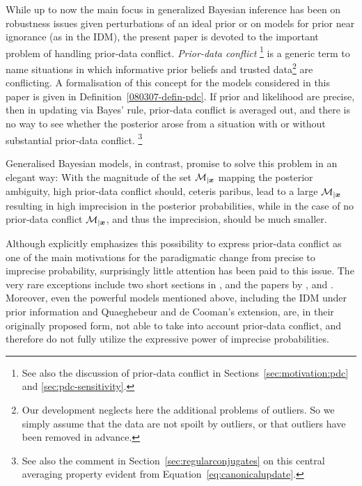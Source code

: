 While up to now the main focus in generalized Bayesian inference
has been on robustness issues given perturbations of an ideal
prior \parencite[e.g.,][]{2000:rios} or
on models for prior near ignorance (as in the IDM), the present
paper is devoted to the important problem of handling
prior-data conflict. \emph{Prior-data conflict}%
\footnote{See also the discussion of prior-data conflict
in Sections~\ref{sec:motivation:pdc} and \ref{sec:pdc-sensitivity}.}
is a generic term
to name situations in which informative prior beliefs and
trusted data\footnote{Our development neglects here
the additional problems of outliers. So we simply assume that the
data are not spoilt by outliers, or that outliers have been
removed in advance.} are conflicting. %
A formalisation of this concept for the models considered
in this paper is given in Definition~\ref{080307-defin-pdc}.
If prior and likelihood are precise, then in updating via
Bayes' rule, prior-data conflict is averaged out, and there
is no way to see whether the posterior arose from a
situation with or without substantial prior-data conflict.%
\footnote{See also the comment in Section~\ref{sec:regularconjugates}
on this central averaging property evident from Equation~\eqref{eq:canonicalupdate}.}

Generalised Bayesian models, in contrast, promise to solve this
problem in an elegant way: With the magnitude
of the set ${\cal M}_{|{\bm x}}$ mapping the posterior ambiguity,
high prior-data conflict should, ceteris paribus, lead to a large
${\cal M}_{|{\bm x}}$ resulting in high imprecision in the
posterior probabilities, while in the case of no prior-data conflict
${\cal M}_{|{\bm x}}$, and thus the imprecision,
should be much smaller.%

Although \textcite[\S 5.2.2]{1991:walley} explicitly emphasizes this possibility to
express prior-data conflict as one of the main motivations for the
paradigmatic change from precise to imprecise probability,
surprisingly little attention has been paid to this issue. The very
rare exceptions include two short sections in \textcite[p.~6 and \S 5.4]{1991:walley}, and
the papers by \textcite{1991:pericchi}, \textcite{1994:coolen} and
\textcite{2005:whitcomb}. Moreover, even the powerful models mentioned
above, including the IDM under prior information and Quaeghebeur and
de Cooman's extension, are, in their originally proposed form, not
able to take into account prior-data conflict, and therefore do not
fully utilize the expressive power of imprecise probabilities.

